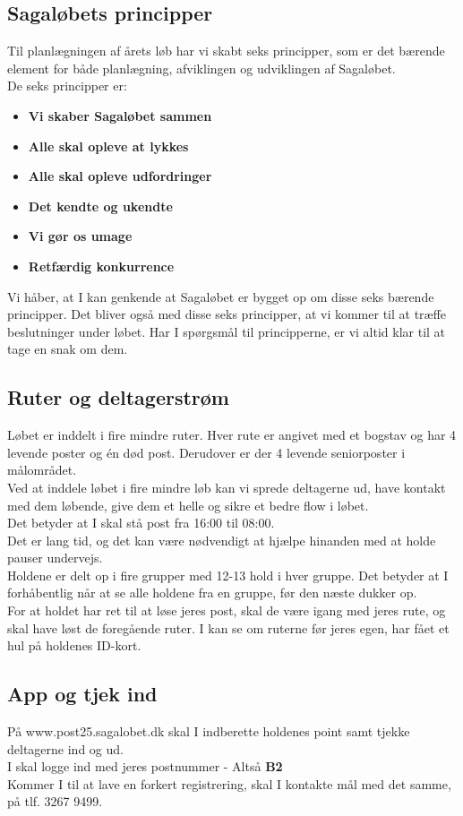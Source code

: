 \subsection{Sagaløbets principper}
Til planlægningen af årets løb har vi skabt seks principper, som er det bærende element for både planlægning, afviklingen og udviklingen af Sagaløbet.\\
De seks principper er:
\begin{itemize}
  \item \textbf{Vi skaber Sagaløbet sammen}
  \item \textbf{Alle skal opleve at lykkes}
  \item \textbf{Alle skal opleve udfordringer}
  \item \textbf{Det kendte og ukendte}
  \item \textbf{Vi gør os umage}
  \item \textbf{Retfærdig konkurrence}
\end{itemize}
Vi håber, at I kan genkende at Sagaløbet er bygget op om disse seks bærende principper. Det bliver også med disse seks principper, at vi kommer til at træffe beslutninger under løbet. Har I spørgsmål til principperne, er vi altid klar til at tage en snak om dem.
\subsection{Ruter og deltagerstrøm}
Løbet er inddelt i fire mindre ruter. Hver rute er angivet med et bogstav og har 4 levende poster og én død post. Derudover er der 4 levende seniorposter i målområdet.\\
Ved at inddele løbet i fire mindre løb kan vi sprede deltagerne ud, have kontakt med dem løbende, give dem et helle og sikre et bedre flow i løbet.\\
\newline
Det betyder at I skal stå post fra 16:00 til 08:00.\\
Det er lang tid, og det kan være nødvendigt at hjælpe hinanden med at holde pauser undervejs.\\
\newline
Holdene er delt op i fire grupper med 12-13 hold i hver gruppe. Det betyder at I forhåbentlig når at se alle holdene fra en gruppe, før den næste dukker op.\\
For at holdet har ret til at løse jeres post, skal de være igang med jeres rute, og skal have løst de foregående ruter. I kan se om ruterne før jeres egen, har fået et hul på holdenes ID-kort.
\subsection{App og tjek ind}
På www.post25.sagalobet.dk skal I indberette holdenes point samt tjekke deltagerne ind og ud.\\
I skal logge ind med jeres postnummer - Altså \textbf{B2}\\
\newline
Kommer I til at lave en forkert registrering, skal I kontakte mål med det samme, på tlf. 3267 9499.
\newpage
\vspace*{.4cm}
